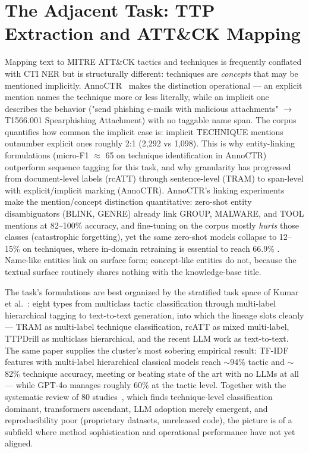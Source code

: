 \documentclass[11pt]{article}
\begin{document}
\section{The Adjacent Task: TTP Extraction and ATT\&CK Mapping}

Mapping text to MITRE ATT\&CK tactics and techniques is frequently conflated with CTI NER but is structurally different: techniques are \emph{concepts} that may be mentioned implicitly. AnnoCTR~\citep{lange2024annoctr} makes the distinction operational — an explicit mention names the technique more or less literally, while an implicit one describes the behavior ("send phishing e-mails with malicious attachments" $\rightarrow$ T1566.001 Spearphishing Attachment) with no taggable name span. The corpus quantifies how common the implicit case is: implicit TECHNIQUE mentions outnumber explicit ones roughly 2:1 (2,292 vs 1,098). This is why entity-linking formulations (micro-F1 $\approx$ 65 on technique identification in AnnoCTR) outperform sequence tagging for this task, and why granularity has progressed from document-level labels (rcATT) through sentence-level (TRAM) to span-level with explicit/implicit marking (AnnoCTR). AnnoCTR's linking experiments make the mention/concept distinction quantitative: zero-shot entity disambiguators (BLINK, GENRE) already link GROUP, MALWARE, and TOOL mentions at 82--100\% accuracy, and fine-tuning on the corpus mostly \emph{hurts} those classes (catastrophic forgetting), yet the same zero-shot models collapse to 12--15\% on techniques, where in-domain retraining is essential to reach 66.9\% \citep{lange2024annoctr}. Name-like entities link on surface form; concept-like entities do not, because the textual surface routinely shares nothing with the knowledge-base title.

The task's formulations are best organized by the stratified task space of Kumar et al.~\citep{crossman2026constructing}: eight types from multiclass tactic classification through multi-label hierarchical tagging to text-to-text generation, into which the lineage slots cleanly — TRAM as multi-label technique classification, rcATT as mixed multi-label, TTPDrill as multiclass hierarchical, and the recent LLM work as text-to-text. The same paper supplies the cluster's most sobering empirical result: TF-IDF features with multi-label hierarchical classical models reach $\sim$94\% tactic and $\sim$82\% technique accuracy, meeting or beating state of the art with no LLMs at all — while GPT-4o manages roughly 60\% at the tactic level. Together with the systematic review of 80 studies~\citep{tamanna2026what}, which finds technique-level classification dominant, transformers ascendant, LLM adoption merely emergent, and reproducibility poor (proprietary datasets, unreleased code), the picture is of a subfield where method sophistication and operational performance have not yet aligned.
\end{document}
